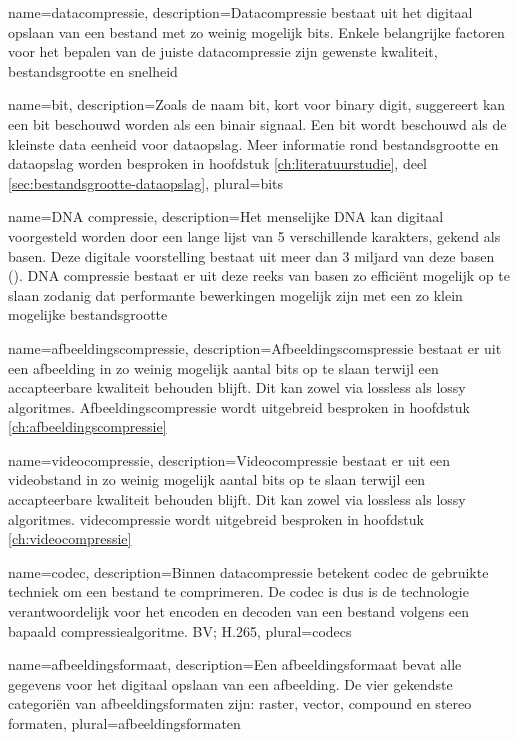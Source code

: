 {
	name={datacompressie},
	description={Datacompressie bestaat uit het digitaal opslaan van een bestand met zo weinig mogelijk bits. Enkele belangrijke factoren voor het bepalen van de juiste datacompressie zijn gewenste kwaliteit, bestandsgrootte en snelheid}
}

{
	name={bit},
	description={Zoals de naam bit, kort voor binary digit, suggereert kan een bit beschouwd worden als een binair signaal. Een bit wordt beschouwd als de kleinste data eenheid voor dataopslag. Meer informatie rond bestandsgrootte en dataopslag worden besproken in hoofdstuk \ref{ch:literatuurstudie}, deel \ref{sec:bestandsgrootte-dataopslag}},
	plural={bits}
}

{
	name={DNA compressie},
	description={Het menselijke DNA kan digitaal voorgesteld worden door een lange lijst van 5 verschillende karakters, gekend als basen. Deze digitale voorstelling bestaat uit meer dan 3 miljard van deze basen (\cite{dodanaugent2011}). DNA compressie bestaat er uit deze reeks van basen zo efficiënt mogelijk op te slaan zodanig dat performante bewerkingen mogelijk zijn met een zo klein mogelijke bestandsgrootte}
}

{
	name={afbeeldingscompressie},
	description={Afbeeldingscomspressie bestaat er uit een afbeelding in zo weinig mogelijk aantal bits op te slaan terwijl een accapteerbare kwaliteit behouden blijft. Dit kan zowel via lossless als lossy algoritmes. Afbeeldingscompressie wordt uitgebreid besproken in hoofdstuk \ref{ch:afbeeldingscompressie}}
}

{
	name={videocompressie},
	description={Videocompressie bestaat er uit een videobstand in zo weinig mogelijk aantal bits op te slaan terwijl een accapteerbare kwaliteit behouden blijft. Dit kan zowel via lossless als lossy algoritmes. videcompressie wordt uitgebreid besproken in hoofdstuk \ref{ch:videocompressie}}
}

{
	name={codec},
	description={Binnen datacompressie betekent codec de gebruikte techniek om een bestand te comprimeren. De codec is dus is de technologie verantwoordelijk voor het encoden en decoden van een bestand volgens een bapaald compressiealgoritme. BV; H.265},
	plural={codecs}
}

{
	name={afbeeldingsformaat},
	description={Een afbeeldingsformaat bevat alle gegevens voor het digitaal opslaan van een afbeelding. De vier gekendste categoriën van afbeeldingsformaten zijn: raster, vector, compound en stereo formaten},
	plural={afbeeldingsformaten}
}

